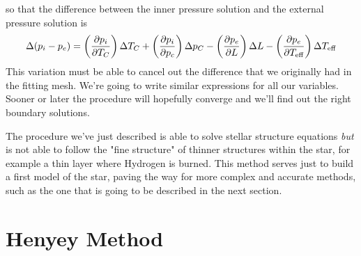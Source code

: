 so that the difference between the inner pressure solution and the external pressure solution is
\begin{equation*}
    \Delta(p_{i}-p_{e}) = \left(\frac{\partial p_{i}}{\partial T_{C}}\right)\Delta T_{C} + \left(\frac{\partial p_{i}}{\partial p_{c}}\right)\Delta p_{C} - \left(\frac{\partial p_{e}}{\partial L}\right)\Delta L - \left(\frac{\partial p_{e}}{\partial T_{\text{eff}}}\right)\Delta T_{\text{eff}}
\end{equation*}
This variation must be able to cancel out the difference that we originally had in the fitting mesh. We're going to write similar expressions for all our variables. Sooner or later the procedure will hopefully converge and we'll find out the right boundary solutions.
\par The procedure we've just described is able to solve stellar structure equations \emph{but} is not able to follow the "fine structure" of thinner structures within the star, for example a thin layer where Hydrogen is burned. This method serves just to build a first model of the star, paving the way for more complex and accurate methods, such as the one that is going to be described in the next section.

\section{Henyey Method}

